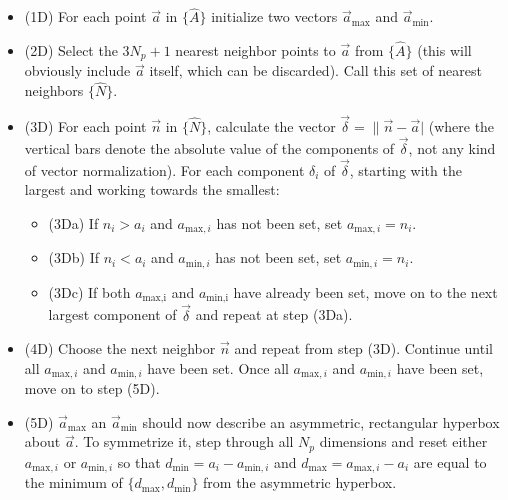 \documentclass[useAMS,usenatbib]{aastex}
\begin{document}
\begin{itemize}
\item(1D) For each point $\vec{a}$ in $\{\hat{A}\}$ initialize two vectors $\vec{a}_\text{max}$ and
$\vec{a}_\text{min}$.

\item(2D) Select the $3N_p+1$ nearest neighbor points to $\vec{a}$ from
$\{\hat{A}\}$ (this will obviously include $\vec{a}$ itself, which can be discarded).  Call
this set of nearest neighbors $\{\hat{N}\}$.
\\
\item(3D) For each point $\vec{n}$ in $\{\hat{N}\}$, calculate the vector
$\vec{\delta}=\|\vec{n}-\vec{a}|$ (where the vertical bars denote the absolute value of the
components of $\vec{\delta}$, not any kind of vector normalization).  For each component
$\delta_i$ of $\vec{\delta}$, starting with the largest and working towards the smallest:
\\
\begin{itemize}
\item(3Da) If $n_i>a_i$ and $a_{\text{max},i}$ has not been set, set $a_{\text{max},i}=n_i$.
\\
\item(3Db) If $n_i<a_i$ and $a_{\text{min},i}$ has not been set, set $a_{\text{min},i}=n_i$.
\\
\item(3Dc) If both $a_\text{max,i}$ and $a_\text{min,i}$ have already been set, move on to the
next largest component of $\vec{\delta}$ and repeat at step (3Da).
\end{itemize}
\item(4D) Choose the next neighbor $\vec{n}$ and repeat from step (3D). Continue until all
$a_{\text{max},i}$ and $a_{\text{min},i}$ have been set.  Once all $a_{\text{max},i}$ and
$a_{\text{min},i}$ have been set, move on to step (5D).
\\
\item(5D) $\vec{a}_\text{max}$ an $\vec{a}_\text{min}$ should now describe an asymmetric,
rectangular hyperbox about $\vec{a}$.  To symmetrize it, step through all $N_p$ dimensions
and reset either $a_{\text{max},i}$ or $a_{\text{min},i}$ so that 
$d_\text{min}=a_i-a_{\text{min},i}$ and
$d_\text{max}=a_{\text{max},i}-a_i$ are equal to the minimum of $\{d_\text{max},d_\text{min}\}$
from the asymmetric hyperbox.
\end{itemize}
\end{document}
